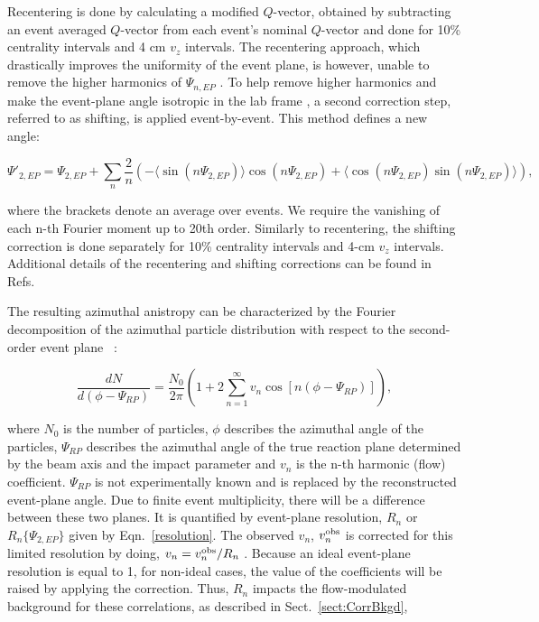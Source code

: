 Recentering is done by calculating a modified $Q$-vector, obtained by subtracting an event averaged $Q$-vector from each event's nominal $Q$-vector and done for 10\% centrality intervals and 4 cm $v_z$ intervals.  The recentering approach, which drastically improves the uniformity of the event plane, is however, unable to remove the higher harmonics of $\Psi_{n,EP}$ \cite{Poskanzer:1998yz}.  To help remove higher harmonics and make the event-plane angle isotropic in the lab frame \cite{Voloshin:2008dg}, a second correction step, referred to as shifting, is applied event-by-event.  This method defines a new angle:

\begin{equation}
	\Psi'_{2,EP} = \Psi_{2,EP} + \sum_n \frac{2}{n}
	(- \langle \sin (n\Psi_{2,EP}) \rangle \cos(n\Psi_{2,EP}) + \langle \cos(n\Psi_{2,EP}) \sin(n\Psi_{2,EP}) \rangle) ,
	\label{eqn:Shift}
\end{equation}

\noindent where the brackets denote an average over events.  We require the vanishing of each n-th Fourier moment up to 20th order.  Similarly to recentering, the shifting correction is done separately for 10\% centrality intervals and 4-cm $v_z$ intervals.  Additional details of the recentering and shifting corrections can be found in Refs.~\cite{Wang:2012bga,Barrette:1997pt,Poskanzer:1998yz}

The resulting azimuthal anistropy can be characterized by the Fourier decomposition of the azimuthal particle distribution with respect to the second-order event plane ~\cite{Bielcikova:2003ku,Voloshin:1994mz}:

\begin{equation}
	\frac{dN}{d(\phi - \Psi_{RP})} = \frac{N_0}{2\pi} \left( 1 + 2 \sum_{n=1}^{\infty} v_n \cos[n(\phi - \Psi_{RP})] \right),
	\label{fourier_azi_part_distr}
\end{equation}

\noindent where $N_0$ is the number of particles, $\phi$ describes the azimuthal angle of the particles, $\Psi_{RP}$ describes the azimuthal angle of the true reaction plane determined by the beam axis and the impact parameter and $v_n$ is the n-th harmonic (flow) coefficient. $\Psi_{RP}$ is not experimentally known and is replaced by the reconstructed event-plane angle.  Due to finite event multiplicity, there will be a difference between these two planes.  It is quantified by event-plane resolution, $R_n$ or $R_n\{\Psi_{2, EP}\}$ given by Eqn.~\ref{resolution}. The observed $v_n$, $v_n^{\rm obs}$ is corrected for this limited resolution by doing, $v_n = v_{n}^{\rm obs}/R_n$ \cite{Abbas:2013taa,Poskanzer:1998yz}.  Because an ideal event-plane resolution is equal to 1, for non-ideal cases, the value of the coefficients will be raised by applying the correction. Thus, $R_n$ impacts the flow-modulated background for these correlations, as described in Sect.~\ref{sect:CorrBkgd},

